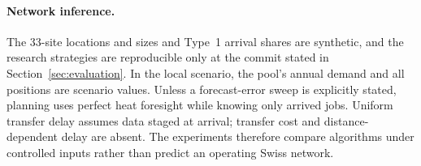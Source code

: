 \paragraph{Network inference.} The 33-site locations and sizes and Type~1 arrival shares are
synthetic, and the research strategies are reproducible only at the commit stated in
Section~\ref{sec:evaluation}. In the local scenario, the pool's annual demand and all positions
are scenario values. Unless a forecast-error sweep is explicitly stated, planning uses perfect heat
foresight while knowing only arrived jobs. Uniform transfer delay assumes data staged at arrival;
transfer cost and distance-dependent delay are absent. The experiments therefore compare
algorithms under controlled inputs rather than predict an operating Swiss network.
